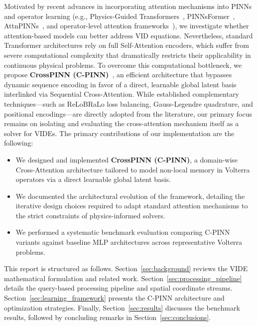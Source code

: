 Motivated by recent advances in incorporating attention mechanisms into PINNs and operator learning (e.g., Physics-Guided Transformers~\cite{zeraatkar2026pgt}, PINNsFormer~\cite{zhao2023pinnsformer}, AttnPINNs~\cite{song2026attnpinns}, and operator-level attention frameworks~\cite{kissas2022learning}), we investigate whether attention-based models can better address VID equations. Nevertheless, standard Transformer architectures rely on full Self-Attention encoders,
which suffer from severe computational complexity that dramatically restricts their applicability in continuous physical problems. To overcome this computational bottleneck, we propose \textbf{CrossPINN (C-PINN)}~\cite{rossi2026crosspinn}, an efficient architecture that bypasses dynamic sequence encoding in favor of a direct, learnable global latent basis interlinked via Sequential Cross-Attention.
While established complementary techniques—such as ReLoBRaLo loss balancing, Gauss-Legendre quadrature, and positional encodings—are directly adopted from the literature, our primary focus remains on isolating and evaluating the cross-attention mechanism itself as a solver for VIDEs.
The primary contributions of our implementation are the following:
\begin{itemize}
    \item We designed and implemented \textbf{CrossPINN (C-PINN)}, a domain-wise Cross-Attention architecture tailored to model non-local memory in Volterra operators via a direct learnable global latent basis.
    \item We documented the architectural evolution of the framework, detailing the iterative design choices required to adapt standard attention mechanisms to the strict constraints of physics-informed solvers.
    \item We performed a systematic benchmark evaluation comparing C-PINN variants against baseline MLP architectures across representative Volterra problems.
\end{itemize}

This report is structured as follows. Section~\ref{sec:background} reviews the VIDE mathematical formulation and related work. Section~\ref{sec:processing_pipeline} details the query-based processing pipeline and spatial coordinate streams. Section~\ref{sec:learning_framework} presents the C-PINN architecture and optimization strategies. Finally, Section~\ref{sec:results} discusses the benchmark results, followed by concluding remarks in Section~\ref{sec:conclusions}.
